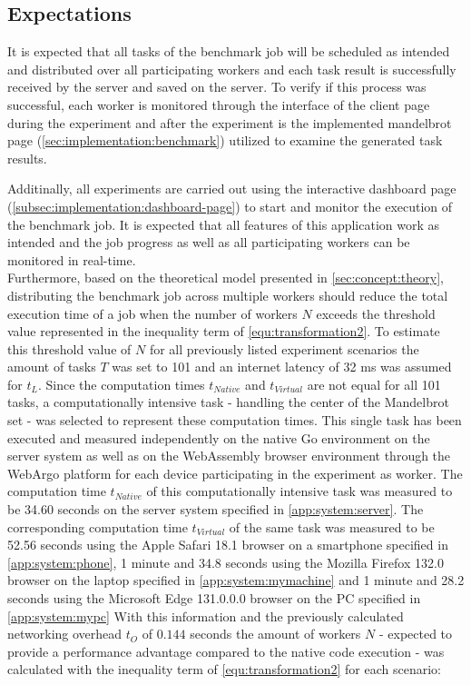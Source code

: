 \subsection{Expectations}
It is expected that all tasks of the benchmark job will be scheduled as intended and distributed over all participating workers and each task result is successfully received by the server and saved on the server. To verify if this process was successful, each worker is monitored through the interface of the client page during the experiment and after the experiment is the implemented mandelbrot page (\autoref{sec:implementation:benchmark}) utilized to examine the generated task results.

Additinally, all experiments are carried out using the interactive dashboard page (\autoref{subsec:implementation:dashboard-page}) to start and monitor the execution of the benchmark job. It is expected that all features of this application work as intended and the job progress as well as all participating workers can be monitored in real-time.
~\\
Furthermore, based on the theoretical model presented in \autoref{sec:concept:theory}, distributing the benchmark job across multiple workers should reduce the total execution time of a job when the number of workers $N$ exceeds the threshold value represented in the inequality term of \eqref{equ:transformation2}. To estimate this threshold value of $N$ for all previously listed experiment scenarios the amount of tasks $T$ was set to 101 and an internet latency of 32 ms \cite{backend:latency} was assumed for $t_{L}$. Since the computation times $t_{Native}$ and $t_{Virtual}$ are not equal for all 101 tasks, a computationally intensive task - handling the center of the Mandelbrot set - was selected to represent these computation times. This single task has been executed and measured independently on the native Go environment on the server system as well as on the WebAssembly browser environment through the WebArgo platform for each device participating in the experiment as worker. The computation time $t_{Native}$ of this computationally intensive task was measured to be 34.60 seconds on the server system specified in \autoref{app:system:server}. The corresponding computation time $t_{Virtual}$ of the same task was measured to be 52.56 seconds using the Apple Safari 18.1 \cite{evaluation:safari} browser on a smartphone specified in \autoref{app:system:phone}, 1 minute and 34.8 seconds using the Mozilla Firefox 132.0 \cite{background:firefox} browser on the laptop specified in \autoref{app:system:mymachine} and 1 minute and 28.2 seconds using the Microsoft Edge 131.0.0.0 \cite{evaluation:edge} browser on the \acs{PC} specified in \autoref{app:system:mypc} With this information and the previously calculated networking overhead $t_{O}$ of $0.144$ seconds the amount of workers $N$ - expected to provide a performance advantage compared to the native code execution - was calculated with the inequality term of \eqref{equ:transformation2} for each scenario:
